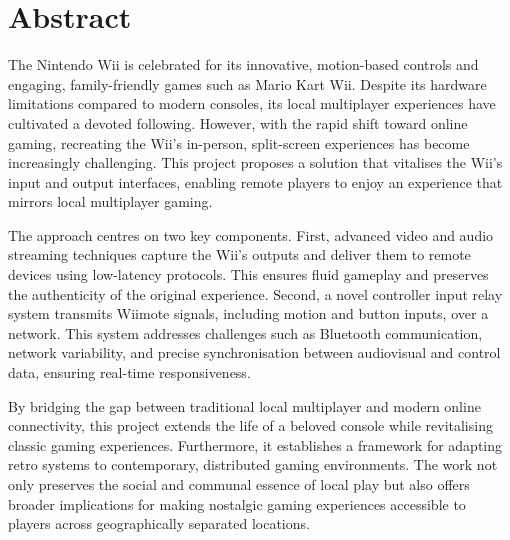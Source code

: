 \chapter*{Abstract}

The Nintendo Wii is celebrated for its innovative, motion-based controls and engaging, family-friendly games such as Mario Kart Wii. Despite its hardware limitations compared to modern consoles, its local multiplayer experiences have cultivated a devoted following. However, with the rapid shift toward online gaming, recreating the Wii’s in-person, split-screen experiences has become increasingly challenging. This project proposes a solution that vitalises the Wii’s input and output interfaces, enabling remote players to enjoy an experience that mirrors local multiplayer gaming.

The approach centres on two key components. First, advanced video and audio streaming techniques capture the Wii’s outputs and deliver them to remote devices using low-latency protocols. This ensures fluid gameplay and preserves the authenticity of the original experience. Second, a novel controller input relay system transmits Wiimote signals, including motion and button inputs, over a network. This system addresses challenges such as Bluetooth communication, network variability, and precise synchronisation between audiovisual and control data, ensuring real-time responsiveness.

By bridging the gap between traditional local multiplayer and modern online connectivity, this project extends the life of a beloved console while revitalising classic gaming experiences. Furthermore, it establishes a framework for adapting retro systems to contemporary, distributed gaming environments. The work not only preserves the social and communal essence of local play but also offers broader implications for making nostalgic gaming experiences accessible to players across geographically separated locations.
